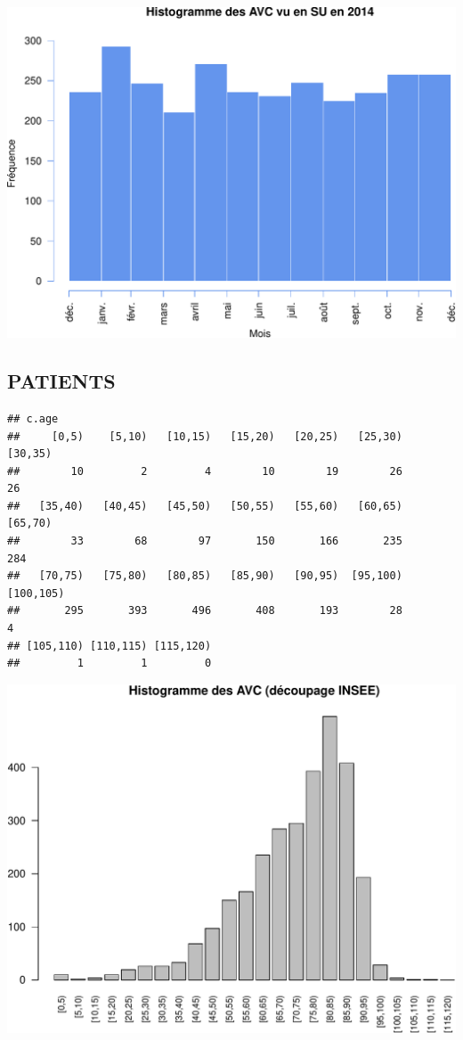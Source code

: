 \documentclass[]{article}
\begin{document}
\includegraphics{rapport2014_V4_files/figure-latex/hist_avc-1.pdf}

\subsection{PATIENTS}\label{patients-3}

\begin{verbatim}
## c.age
##     [0,5)    [5,10)   [10,15)   [15,20)   [20,25)   [25,30)   [30,35) 
##        10         2         4        10        19        26        26 
##   [35,40)   [40,45)   [45,50)   [50,55)   [55,60)   [60,65)   [65,70) 
##        33        68        97       150       166       235       284 
##   [70,75)   [75,80)   [80,85)   [85,90)   [90,95)  [95,100) [100,105) 
##       295       393       496       408       193        28         4 
## [105,110) [110,115) [115,120) 
##         1         1         0
\end{verbatim}

\includegraphics{rapport2014_V4_files/figure-latex/patients-1.pdf}
\end{document}
